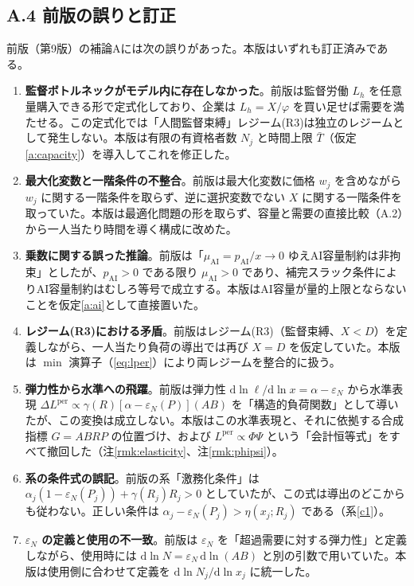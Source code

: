 \documentclass[11pt]{article}
\theoremstyle{plain}
\theoremstyle{definition}
\theoremstyle{remark}
\begin{document}
\subsection*{A.4 前版の誤りと訂正}
前版（第9版）の補論Aには次の誤りがあった。本版はいずれも訂正済みである。
\begin{enumerate}[label=(\arabic*),leftmargin=1.8em,itemsep=2pt]
\item \textbf{監督ボトルネックがモデル内に存在しなかった}。前版は監督労働 $L_h$ を任意量購入できる形で定式化しており、企業は $L_h=X/\varphi$ を買い足せば需要を満たせる。この定式化では「人間監督束縛」レジーム(R3)は独立のレジームとして発生しない。本版は有限の有資格者数 $N_j$ と時間上限 $\bar T$（仮定\ref{a:capacity}）を導入してこれを修正した。
\item \textbf{最大化変数と一階条件の不整合}。前版は最大化変数に価格 $w_j$ を含めながら $w_j$ に関する一階条件を取らず、逆に選択変数でない $X$ に関する一階条件を取っていた。本版は最適化問題の形を取らず、容量と需要の直接比較（A.2）から一人当たり時間を導く構成に改めた。
\item \textbf{乗数に関する誤った推論}。前版は「$\mu_{\mathrm{AI}}=p_{\mathrm{AI}}/x\to0$ ゆえAI容量制約は非拘束」としたが、$p_{\mathrm{AI}}>0$ である限り $\mu_{\mathrm{AI}}>0$ であり、補完スラック条件によりAI容量制約はむしろ等号で成立する。本版はAI容量が量的上限とならないことを仮定\ref{a:ai}として直接置いた。
\item \textbf{レジーム(R3)における矛盾}。前版はレジーム(R3)（監督束縛、$X<D$）を定義しながら、一人当たり負荷の導出では再び $X=D$ を仮定していた。本版は $\min$ 演算子（\eqref{eq:lper}）により両レジームを整合的に扱う。
\item \textbf{弾力性から水準への飛躍}。前版は弾力性 $\mathrm d\ln\ell/\mathrm d\ln x=\alpha-\varepsilon_N$ から水準表現 $\Delta L^{\text{per}}\propto\gamma(R)[\alpha-\varepsilon_N(P)](AB)$ を「構造的負荷関数」として導いたが、この変換は成立しない。本版はこの水準表現と、それに依拠する合成指標 $G=ABRP$ の位置づけ、および $L^{\text{per}}\propto\Phi\Psi$ という「会計恒等式」をすべて撤回した（注\ref{rmk:elasticity}、注\ref{rmk:phipsi}）。
\item \textbf{系の条件式の誤記}。前版の系「激務化条件」は $\alpha_j(1-\varepsilon_N(P_j))+\gamma(R_j)R_j>0$ としていたが、この式は導出のどこからも従わない。正しい条件は $\alpha_j-\varepsilon_N(P_j)>\eta(x_j;R_j)$ である（系\ref{c1}）。
\item \textbf{$\varepsilon_N$ の定義と使用の不一致}。前版は $\varepsilon_N$ を「超過需要に対する弾力性」と定義しながら、使用時には $\mathrm d\ln N=\varepsilon_N\,\mathrm d\ln(AB)$ と別の引数で用いていた。本版は使用側に合わせて定義を $\mathrm d\ln N_j/\mathrm d\ln x_j$ に統一した。
\end{enumerate}
\end{document}
